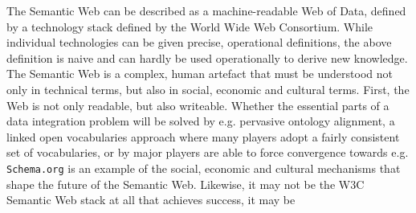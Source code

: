 The Semantic Web can be described as a machine-readable Web of Data,
defined by a technology stack defined by the World Wide Web
Consortium. While individual technologies can be given precise,
operational definitions, the above definition is naive and can hardly
be used operationally to derive new knowledge. The Semantic Web is a
complex, human artefact that must be understood not only in technical
terms, but also in social, economic and cultural terms. First, the Web
is not only readable, but also writeable. Whether the essential parts
of a data integration problem will be solved by e.g. pervasive
ontology alignment, a linked open vocabularies approach where many
players adopt a fairly consistent set of vocabularies, or by major
players are able to force convergence towards e.g. \texttt{Schema.org}
is an example of the social, economic and cultural mechanisms that
shape the future of the Semantic Web. Likewise, it may not be the W3C
Semantic Web stack at all that achieves success, it may be
